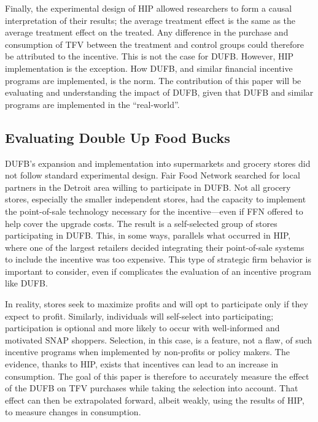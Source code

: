 \documentclass[12pt,letterpaperpaper,]{book}
\begin{document}
Finally, the experimental design of HIP allowed researchers to form a
causal interpretation of their results; the average treatment effect is
the same as the average treatment effect on the treated. Any difference
in the purchase and consumption of TFV between the treatment and control
groups could therefore be attributed to the incentive. This is not the
case for DUFB. However, HIP implementation is the exception. How DUFB,
and similar financial incentive programs are implemented, is the norm.
The contribution of this paper will be evaluating and understanding the
impact of DUFB, given that DUFB and similar programs are implemented in
the ``real-world''.

\subsection*{Evaluating Double Up Food
Bucks}\label{evaluating-double-up-food-bucks}

DUFB's expansion and implementation into supermarkets and grocery stores
did not follow standard experimental design. Fair Food Network searched
for local partners in the Detroit area willing to participate in DUFB.
Not all grocery stores, especially the smaller independent stores, had
the capacity to implement the point-of-sale technology necessary for the
incentive---even if FFN offered to help cover the upgrade costs. The
result is a self-selected group of stores participating in DUFB. This,
in some ways, parallels what occurred in HIP, where one of the largest
retailers decided integrating their point-of-sale systems to include the
incentive was too expensive. This type of strategic firm behavior is
important to consider, even if complicates the evaluation of an
incentive program like DUFB.

In reality, stores seek to maximize profits and will opt to participate
only if they expect to profit. Similarly, individuals will self-select
into participating; participation is optional and more likely to occur
with well-informed and motivated SNAP shoppers. Selection, in this case,
is a feature, not a flaw, of such incentive programs when implemented by
non-profits or policy makers. The evidence, thanks to HIP, exists that
incentives can lead to an increase in consumption. The goal of this
paper is therefore to accurately measure the effect of the DUFB on TFV
purchases while taking the selection into account. That effect can then
be extrapolated forward, albeit weakly, using the results of HIP, to
measure changes in consumption.
\end{document}
